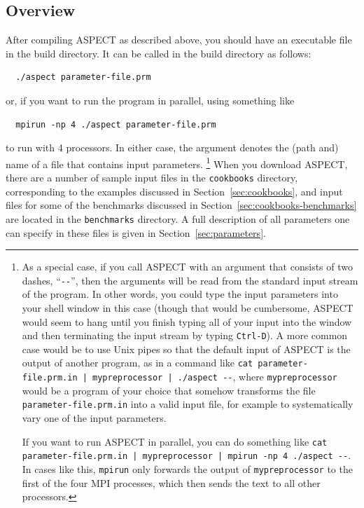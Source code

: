 \documentclass{article}
\newcommand{\aspect}{\textsc{ASPECT}}
\begin{document}
\subsection{Overview}
\label{sec:running-overview}

After compiling \aspect{} as described above, you should have an executable
file in the build directory. It can be called in the build directory as follows:
\begin{verbatim}
  ./aspect parameter-file.prm
\end{verbatim}
or, if you want to run the program in parallel, using something like
\begin{verbatim}
  mpirun -np 4 ./aspect parameter-file.prm
\end{verbatim}
to run with 4 processors. In either case, the argument denotes the (path and)
name of a file that contains input parameters.%
\footnote{As a special case, if you call \aspect{} with an argument that
consists of two dashes, ``\texttt{-{}-}'', then the arguments will be read from
the standard input stream of the program. In other words, you could type the
input parameters into your shell window in this case (though that would be
cumbersome, \aspect{} would seem to hang until you finish typing all of your
input into the window and then terminating the input stream by typing
\texttt{Ctrl-D}). A more common case would be to use Unix pipes so that the
default
input of \aspect{} is the output of another program, as in a command like
\texttt{cat parameter-file.prm.in | mypreprocessor | ./aspect -{}-}, where
\texttt{mypreprocessor} would be a program of your choice that somehow
transforms the file \texttt{parameter-file.prm.in} into a valid input file,
for example to systematically vary one of the input parameters.

If you want to run \aspect{} in parallel, you can do something like
\texttt{cat parameter-file.prm.in | mypreprocessor | mpirun -np 4 ./aspect
  -{}-}. In cases like this, \texttt{mpirun} only forwards the output of
\texttt{mypreprocessor} to the first of the four MPI processes, which then
sends the text to all other processors.}
When you download \aspect{}, there are a number of sample input files in the
\texttt{cookbooks} directory, corresponding to the examples discussed in
Section~\ref{sec:cookbooks}, and input files for some of the benchmarks discussed
in Section~\ref{sec:cookbooks-benchmarks} are located in the \texttt{benchmarks}
directory. A full description of all parameters one can specify in these files
is given in Section~\ref{sec:parameters}.
\end{document}
